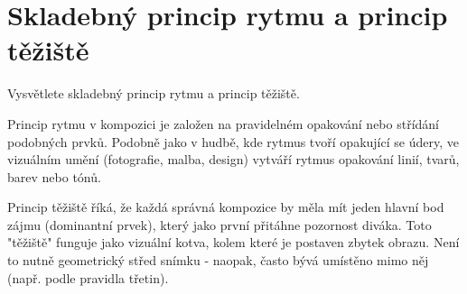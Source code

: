 \section{Skladebný princip rytmu a princip těžiště}
Vysvětlete skladebný princip rytmu a princip těžiště.

Princip rytmu v kompozici je založen na pravidelném opakování nebo střídání podobných prvků. Podobně jako v hudbě, kde 
rytmus tvoří opakující se údery, ve vizuálním umění (fotografie, malba, design) vytváří rytmus opakování linií, tvarů, 
barev nebo tónů.

Princip těžiště říká, že každá správná kompozice by měla mít jeden hlavní bod zájmu (dominantní prvek), který jako první 
přitáhne pozornost diváka. Toto "těžiště" funguje jako vizuální kotva, kolem které je postaven zbytek obrazu. Není to 
nutně geometrický střed snímku - naopak, často bývá umístěno mimo něj (např. podle pravidla třetin).